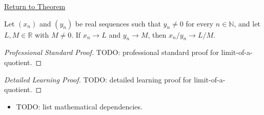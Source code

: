\newpage
{}
\label{prf:limit-of-a-quotient}

\begin{remark*}[Return]
\hyperref[thm:limit-of-a-quotient]{Return to Theorem}
\end{remark*}

\begin{theorem*}
Let $(x_n)$ and $(y_n)$ be real sequences such that $y_n\neq 0$ for every
$n\in\mathbb{N}$, and let $L,M\in\mathbb{R}$ with $M\neq 0$. If
$x_n\to L$ and $y_n\to M$, then $x_n/y_n\to L/M$.

\smallskip
\noindent
\end{theorem*}

\begin{proof}[Professional Standard Proof]
\LRAProofBodyStart
TODO: professional standard proof for limit-of-a-quotient.
\end{proof}

\begin{proof}[Detailed Learning Proof]
\LRAProofBodyStart
TODO: detailed learning proof for limit-of-a-quotient.
\end{proof}

\begin{remark*}
\end{remark*}

\begin{dependencies}
\begin{itemize}
  \item TODO: list mathematical dependencies.
\end{itemize}
\end{dependencies}

\clearpage
